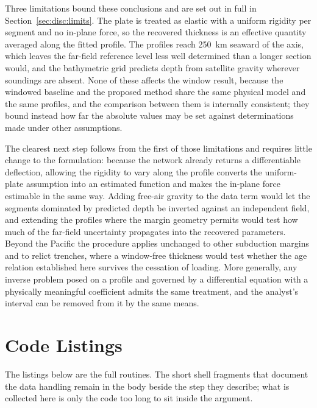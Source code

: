 \documentclass[final]{agujournal2019}
\begin{document}
Three limitations bound these conclusions and are set out in full in
Section~\ref{sec:disc:limits}. The plate is treated as elastic with a uniform
rigidity per segment and no in-plane force, so the recovered thickness is an
effective quantity averaged along the fitted profile. The profiles reach 250~km
seaward of the axis, which leaves the far-field reference level less well
determined than a longer section would, and the bathymetric grid predicts depth
from satellite gravity wherever soundings are absent. None of these affects the
window result, because the windowed baseline and the proposed method share the
same physical model and the same profiles, and the comparison between them is
internally consistent; they bound instead how far the absolute values may be set
against determinations made under other assumptions.

The clearest next step follows from the first of those limitations and requires
little change to the formulation: because the network already returns a
differentiable deflection, allowing the rigidity to vary along the profile
converts the uniform-plate assumption into an estimated function and makes the
in-plane force estimable in the same way. Adding free-air gravity to the data
term would let the segments dominated by predicted depth be inverted against an
independent field, and extending the profiles where the margin geometry permits
would test how much of the far-field uncertainty propagates into the recovered
parameters. Beyond the Pacific the procedure applies unchanged to other
subduction margins and to relict trenches, where a window-free thickness would
test whether the age relation established here survives the cessation of
loading. More generally, any inverse problem posed on a profile and governed by
a differential equation with a physically meaningful coefficient admits the same
treatment, and the analyst's interval can be removed from it by the same means.

\appendix
\section{Code Listings}\label{app:code}

The listings below are the full routines. The short shell fragments that
document the data handling remain in the body beside the step they
describe; what is collected here is only the code too long to sit inside
the argument.
\end{document}
